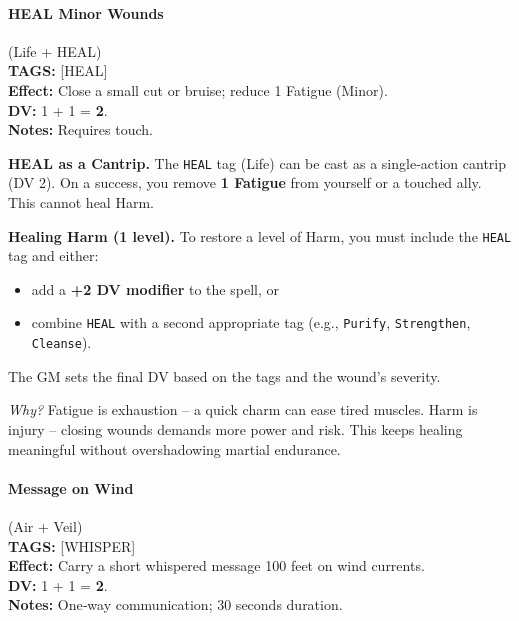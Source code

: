 \paragraph{HEAL Minor Wounds} (Life + HEAL) \\
\textbf{TAGS:} {[HEAL]} \\
\textbf{Effect:} Close a small cut or bruise; reduce 1 Fatigue (Minor). \\
\textbf{DV:} 1 + 1 = \textbf{2}. \\
\textbf{Notes:} Requires touch.

\begin{tcolorbox}[
    colback=parchment,
    colframe=bronze,
    sharp corners,
    breakable,
    enhanced,
    title=Healing Harm and Fatigue,
    fonttitle=\bfseries,
    attach boxed title to top left={yshift=-2mm,xshift=4mm},
    boxed title style={colback=bronze, colframe=bronze, sharp corners, rounded corners=north}
]

\textbf{HEAL as a Cantrip.} The \texttt{HEAL} tag (Life) can be cast as a single‑action cantrip (DV 2). On a success, you remove \textbf{1 Fatigue} from yourself or a touched ally. This cannot heal Harm.

\textbf{Healing Harm (1 level).} To restore a level of Harm, you must include the \texttt{HEAL} tag and either:
\begin{itemize}
    \item add a \textbf{+2 DV modifier} to the spell, or
    \item combine \texttt{HEAL} with a second appropriate tag (e.g., \texttt{Purify}, \texttt{Strengthen}, \texttt{Cleanse}).
\end{itemize}
The GM sets the final DV based on the tags and the wound's severity.

\textit{Why?} Fatigue is exhaustion -- a quick charm can ease tired muscles. Harm is injury -- closing wounds demands more power and risk. This keeps healing meaningful without overshadowing martial endurance.

\end{tcolorbox}

\paragraph{Message on Wind} (Air + Veil) \\
\textbf{TAGS:} {[WHISPER]} \\
\textbf{Effect:} Carry a short whispered message 100 feet on wind currents. \\
\textbf{DV:} 1 + 1 = \textbf{2}. \\
\textbf{Notes:} One‑way communication; 30 seconds duration.

